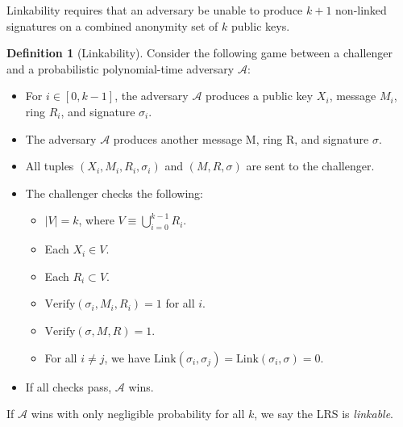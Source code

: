 \documentclass{article}
\newcommand{\A}{\mathcal{A}}
\theoremstyle{definition}
\newtheorem{definition}{Definition}
\begin{document}
Linkability requires that an adversary be unable to produce $k+1$ non-linked signatures on a combined anonymity set of $k$ public keys.
\begin{definition}[Linkability]
Consider the following game between a challenger and a probabilistic polynomial-time adversary $\A$:
\begin{itemize}
\item For $i \in [0,k-1]$, the adversary $\A$ produces a public key $X_i$, message $M_i$, ring $R_i$, and signature $\sigma_i$.
\item The adversary $\A$ produces another message M, ring R, and signature $\sigma$.
\item All tuples $(X_i,M_i,R_i,\sigma_i)$ and $(M,R,\sigma)$ are sent to the challenger.
\item The challenger checks the following:
\begin{itemize}
\item $\left| V \right| = k$, where $V \equiv \bigcup_{i=0}^{k-1} R_i$.
\item Each $X_i \in V$.
\item Each $R_i \subset V$.
\item $\text{Verify}(\sigma_i,M_i,R_i) = 1$ for all $i$.
\item $\text{Verify}(\sigma,M,R) = 1$.
\item For all $i \neq j$, we have $\text{Link}(\sigma_i,\sigma_j) = \text{Link}(\sigma_i,\sigma) = 0$.
\end{itemize}
\item If all checks pass, $\A$ wins.
\end{itemize}
If $\A$ wins with only negligible probability for all $k$, we say the LRS is \textit{linkable}.
\end{definition}
\end{document}
